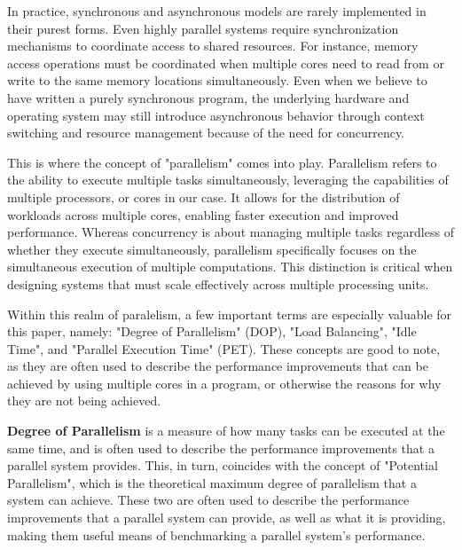 \documentclass[12pt,a4paper]{article}
\begin{document}
In practice, synchronous and asynchronous models are rarely implemented in their purest forms. Even highly parallel systems require synchronization mechanisms to coordinate access to shared resources\parencite[p. 95]{Rauber2023}. For instance, memory access operations must be coordinated when multiple cores need to read from or write to the same memory locations simultaneously. Even when we believe to have written a purely synchronous program, the underlying hardware and operating system may still introduce asynchronous behavior through context switching and resource management because of the need for concurrency.

This is where the concept of "parallelism" comes into play\parencite[pp. 4-5]{Rauber2023}. Parallelism refers to the ability to execute multiple tasks simultaneously, leveraging the capabilities of multiple processors, or cores in our case. It allows for the distribution of workloads across multiple cores, enabling faster execution and improved performance. Whereas concurrency is about managing multiple tasks regardless of whether they execute simultaneously, parallelism specifically focuses on the simultaneous execution of multiple computations. This distinction is critical when designing systems that must scale effectively across multiple processing units.

Within this realm of paralelism, a few important terms are especially valuable for this paper, namely: "Degree of Parallelism" (DOP)\parencite[pp. 11-13]{Rauber2023}, "Load Balancing"\parencite[p. 5]{Rauber2023}, "Idle Time"\parencite[p. 5]{Rauber2023}, and "Parallel Execution Time" (PET)\parencite[p. 5]{Rauber2023}. These concepts are good to note, as they are often used to describe the performance improvements that can be achieved by using multiple cores in a program, or otherwise the reasons for why they are not being achieved.

\textbf{Degree of Parallelism} is a measure of how many tasks can be executed at the same time, and is often used to describe the performance improvements that a parallel system provides. This, in turn, coincides with the concept of "Potential Parallelism", which is the theoretical maximum degree of parallelism that a system can achieve. These two are often used to describe the performance improvements that a parallel system can provide, as well as what it is providing, making them useful means of benchmarking a parallel system's performance.
\end{document}
